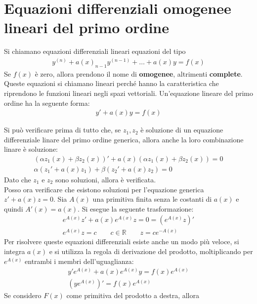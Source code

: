 \documentclass[a4paper, oneside]{book}
\begin{document}
\section{Equazioni differenziali omogenee lineari del primo ordine}
\begin{definition}
    Si chiamano equazioni differenziali lineari equazioni del tipo
    \begin{align}
        y^{(n)}  + a(x)_{n - 1}y^{(n - 1)} + \dots + a(x)y = f(x)
    \end{align}
    Se $f(x) $ è zero, allora prendono il nome di \textbf{omogenee}, altrimenti
    \textbf{complete}. Queste equazioni si chiamano lineari perché hanno la 
    caratteristica che riprendono le funzioni lineari negli spazi vettoriali. 
    Un'equazione lineare del primo ordine ha la seguente forma:
    \begin{align}
        y' + a(x) y = f(x)   
    \end{align}
\end{definition} \noindent
Si può verificare prima di tutto che, se $z_1, z_2$ è soluzione di un equazione differenziale linare
del primo ordine generica, allora anche la loro combinazione linare è soluzione:
\begin{gather*}
    (\alpha z_1(x)+\beta z_2(x))' + a(x)(\alpha z_1(x)+\beta z_2(x)) = 0 \\
    \alpha(z_1' + a(x)z_1) + \beta(z_2' + a(x) z_2) = 0
\end{gather*}
Dato che $z_1$ e $z_2$ sono soluzioni, allora è verificata.  \\
Posso ora verificare che esistono soluzioni per l'equazione
generica $z' + a(x)z = 0$. Sia $A(x)$ una primitiva finita senza le costanti 
di $a(x)$ e quindi $A'(x) = a(x)$. Si esegue la seguente trasformazione: 
\begin{gather*}
    e^{A(x)}z' + a(x)e^{A(x)}z = 0 = (e^{A(x)}z)'     \\
    e^{A(x)}z = c \qquad c \in \mathbb{R} \qquad z = ce^{-A(x)}  
\end{gather*}
Per risolvere queste equazioni differenziali esiste anche un modo 
più veloce, si integra $a(x)$ e si utilizza la regola 
di derivazione del prodotto, moltiplicando per $e^{A(x)}$ entrambi i membri dell'uguaglianza:
\begin{gather*}
    y'e^{A(x)} + a(x)e^{A(x)}y = f(x)e^{A(x)}    \\
    (ye^{A(x)} )' = f(x) e^{A(x)} 
\end{gather*}
Se considero $F(x)$ come primitiva del prodotto a destra, allora
\end{document}
